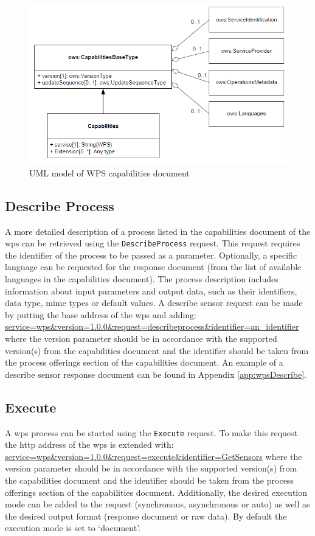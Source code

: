 \begin{figure}
	\centering
	\includegraphics[width=1\linewidth]{UML/WPSmodel2.png}
	\caption{UML model of WPS capabilities document \citep[p. 70]{GEO:OGC}}
	\label{fig:WPSmodel2}
\end{figure}

\subsection{Describe Process}
\begin{sloppypar}
A more detailed description of a process listed in the capabilities document of the \ac{wps} can be retrieved using the \texttt{DescribeProcess} request. This request requires the identifier of the process to be passed as a parameter. Optionally, a specific language can be requested for the response document (from the list of available languages in the capabilities document). The process description includes information about input parameters and output data, such as their identifiers, data type, mime types or default values. A describe sensor request can be made by putting the base address of the \ac{wps} and adding: \url{service=wps&version=1.0.0&request=describeprocess&identifier=an_identifier} where the version parameter should be in accordance with the supported version(s) from the capabilities document and the identifier should be taken from the process offerings section of the capabilities document. An example of a describe sensor response document can be found in Appendix \ref{app:wpsDescribe}.  
\end{sloppypar}


\subsection{Execute}
A \ac{wps} process can be started using the \texttt{Execute} request. To make this request the \ac{http} address of the \ac{wps} is extended with: \url{service=wps&version=1.0.0&request=execute&identifier=GetSensors} where the version parameter should be in accordance with the supported version(s) from the capabilities document and the identifier should be taken from the process offerings section of the capabilities document. Additionally, the desired execution mode can be added to the request (synchronous, asynchronous or auto) as well as the desired output format (response document or raw data). By default the execution mode is set to `document'.


